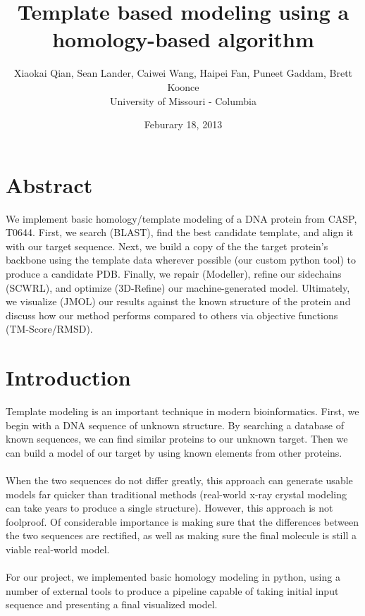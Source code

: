 \documentclass{article}
\title{Template based modeling using a homology-based algorithm}
\author{Xiaokai Qian, Sean Lander, Caiwei Wang, Haipei Fan, Puneet Gaddam, Brett Koonce\\University of Missouri - Columbia}
\date{Feburary 18, 2013}
\begin{document}
\maketitle

\section{Abstract}
We implement basic homology/template modeling of a DNA protein from CASP, T0644.  First, we search (BLAST), find the best candidate template, and align it with our target sequence.  Next, we build a copy of the the target protein's backbone using the template data wherever possible (our custom python tool) to produce a candidate PDB.  Finally, we repair (Modeller), refine our sidechains (SCWRL), and optimize (3D-Refine) our machine-generated model.  Ultimately, we visualize (JMOL) our results against the known structure of the protein and discuss how our method performs compared to others via objective functions (TM-Score/RMSD).

\section{Introduction}

Template modeling is an important technique in modern bioinformatics.  First, we begin with a DNA sequence of unknown structure.  By searching a database of known sequences, we can find similar proteins to our unknown target.  Then we can build a model of our target by using known elements from other proteins.\\\\
When the two sequences do not differ greatly, this approach can generate usable models far quicker than traditional methods (real-world x-ray crystal modeling can take years to produce a single structure).  However, this approach is not foolproof.  Of considerable importance is making sure that the differences between the two sequences are rectified, as well as making sure the final molecule is still a viable real-world model.\\\\
For our project, we implemented basic homology modeling in python, using a number of external tools to produce a pipeline capable of taking initial input sequence and presenting a final visualized model.
\end{document}
